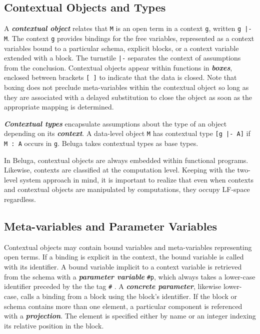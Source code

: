 \documentclass[11pt]{article}
\begin{document}
\subsection{Contextual Objects and Types}
A \textit{\textbf{contextual object}} relates that \texttt{M} is an open term in a context \texttt{g}, written \texttt{g |- M}. The context \texttt{g} provides bindings for the free variables, represented as a context variables bound to a particular schema, explicit blocks, or a context variable extended with a block. The turnstile \texttt{|-} separates the context of assumptions from the conclusion. Contextual objects appear within functions in \textit{\textbf{boxes}}, enclosed between brackets \texttt{[ ]} to indicate that the data is closed. Note that boxing does not preclude meta-variables within the contextual object so long as they are associated with a delayed substitution to close the object as soon as the appropriate mapping is determined. 

\textit{\textbf{Contextual types}} encapsulate assumptions about the type of an object depending on its \textit{\textbf{context}}. A data-level object \texttt{M} has contextual type \texttt{[g |- A]} if \texttt{M : A} occurs in \texttt{g}.  Beluga takes contextual types as base types.

In Beluga, contextual objects are always embedded within functional programs. Likewise, contexts are classified at the computation level. Keeping with the two-level system approach in mind, it is important to realize that even when contexts and contextual objects are manipulated by computations, they occupy LF-space regardless. 

\subsection{Meta-variables and Parameter Variables}
Contextual objects may contain bound variables and meta-variables representing open terms. If a binding is explicit in the context, the bound variable is called with its identifier. A bound variable implicit to a context variable is retrieved from the schema with a \textit{\textbf{parameter variable}} \texttt{\#p}, which always takes a lower-case identifier preceded by the the tag \texttt{\#} . A \textit{\textbf{concrete parameter}}, likewise lower-case, calls a binding from a block using the block's identifier. If the block or schema contains more than one element, a particular component is referenced with a \textbf{\textit{projection}}. The element is specified either by name or an integer indexing its relative position in the block. 
\end{document}
